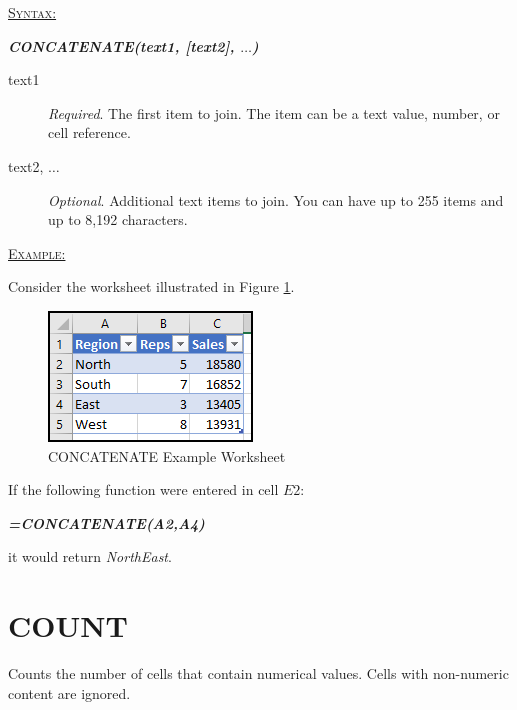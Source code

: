 \begin{addmargin}[1cm]{0cm}

	\medskip
	\underline{\textsc{Syntax:}}
	\medskip

	{\color{Syntax}
		\noindent\textbf{\textit{CONCATENATE(text1, [text2], $\ldots$)}}
	}
	
	\begin{description}
		\item[text1] \textit{Required}. The first item to join. The item can be a text value, number, or cell reference.
		\item[text2, $\ldots$] \textit{Optional}. Additional text items to join. You can have up to 255 items and up to 8,192 characters.
	\end{description}

	\medskip
	\noindent\underline{\textsc{Example:}}
	\medskip
	
	\noindent Consider the worksheet illustrated in Figure \ref{apa:con}.

	\begin{figure}[H]
		\centering
		\includegraphics[width=\maxwidth{.45\linewidth}]{gfx/apa_fig01}
		\caption{CONCATENATE Example Worksheet}
		\label{apa:con}
	\end{figure}
	
	\noindent If the following function were entered in cell $ E2 $:
	
	{\color{Syntax}
		\textit{\textbf{=CONCATENATE(A2,A4)}}
	}
	
	\noindent it would return \textit{NorthEast}.
	
\end{addmargin}

\section{COUNT}

Counts the number of cells that contain numerical values. Cells with non-numeric content are ignored.

